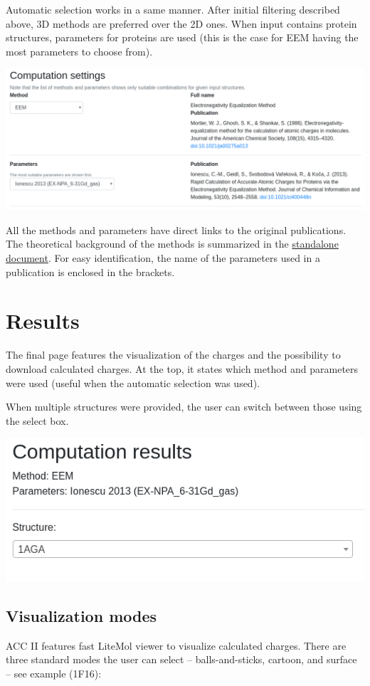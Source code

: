 \documentclass[oneside]{memoir}
\begin{document}
Automatic selection works in a same manner. After initial filtering described above, 3D methods are preferred over the 2D ones. When input contains protein structures, parameters for proteins are used (this is the case for EEM having the most parameters to choose from).

\begin{center}
    \includegraphics[width=.9\linewidth]{images/settings.png}
\end{center}

All the methods and parameters have direct links to the original publications. The theoretical background of the methods is summarized in the \href{https://acc2.ncbr.muni.cz/static/methods.pdf}{standalone document}. For easy identification, the name of the parameters used in a publication is enclosed in the brackets.

\section*{Results}
The final page features the visualization of the charges and the possibility to download calculated charges. At the top, it states which method and parameters were used (useful when the automatic selection was used).

When multiple structures were provided, the user can switch between those using the select box.

\begin{center}
    \includegraphics[width=.5\linewidth]{images/select.png}
\end{center}

\subsection*{Visualization modes}
ACC II features fast LiteMol viewer to visualize calculated charges. There are three standard modes the user can select – balls-and-sticks, cartoon, and surface –  see example (1F16):
\end{document}
